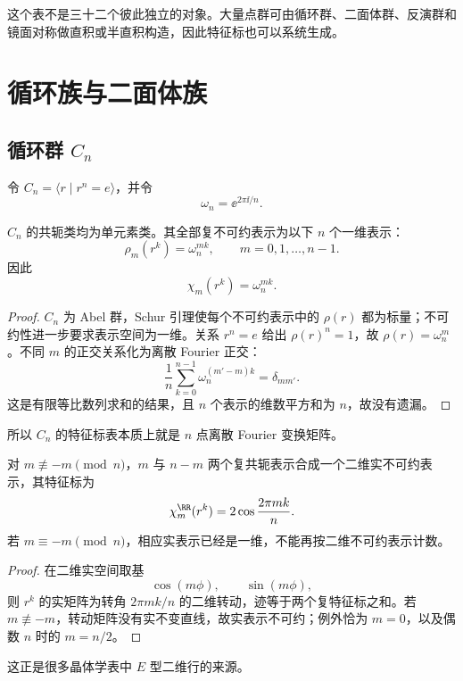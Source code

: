 这个表不是三十二个彼此独立的对象。大量点群可由循环群、二面体群、反演群和镜面对称做直积或半直积构造，因此特征标也可以系统生成。

\section{循环族与二面体族}

\subsection{\texorpdfstring{循环群 $C_n$}{循环群 Cn}}

令 $C_n=\langle r\mid r^n=e\rangle$，并令
\[
\omega_n=\ee^{2\pi\ii/n}.
\]
\begin{proposition}[循环群的全部复不可约特征标]
$C_n$ 的共轭类均为单元素类。其全部复不可约表示为以下 $n$ 个一维表示：
\begin{equation}
\rho_m(r^k)=\omega_n^{mk},
\qquad m=0,1,\dots,n-1.
\label{eq:cn-characters-app}
\end{equation}
因此
\[
\chi_m(r^k)=\omega_n^{mk}.
\]
\end{proposition}
\begin{proof}
$C_n$ 为 Abel 群，Schur 引理使每个不可约表示中的 $\rho(r)$ 都为标量；不可约性进一步要求表示空间为一维。关系 $r^n=e$ 给出 $\rho(r)^n=1$，故 $\rho(r)=\omega_n^m$。不同 $m$ 的正交关系化为离散 Fourier 正交：
\[
\frac1n\sum_{k=0}^{n-1}\omega_n^{(m'-m)k}=\delta_{mm'}.
\]
这是有限等比数列求和的结果，且 $n$ 个表示的维数平方和为 $n$，故没有遗漏。
\end{proof}
所以 $C_n$ 的特征标表本质上就是 $n$ 点离散 Fourier 变换矩阵。

\begin{proposition}[共轭特征标的实基组合]
对 $m\not\equiv-m\pmod n$，$m$ 与 $n-m$ 两个复共轭表示合成一个二维实不可约表示，其特征标为
\begin{equation}
\chi^{\RR}_m(r^k)=2\cos\frac{2\pi mk}{n}.
\label{eq:cn-real-character}
\end{equation}
若 $m\equiv-m\pmod n$，相应实表示已经是一维，不能再按二维不可约表示计数。
\end{proposition}
\begin{proof}
在二维实空间取基
\[
\cos(m\phi),\qquad \sin(m\phi),
\]
则 $r^k$ 的实矩阵为转角 $2\pi mk/n$ 的二维转动，迹等于两个复特征标之和。若 $m\not\equiv-m$，转动矩阵没有实不变直线，故实表示不可约；例外恰为 $m=0$，以及偶数 $n$ 时的 $m=n/2$。
\end{proof}
这正是很多晶体学表中 $E$ 型二维行的来源。

